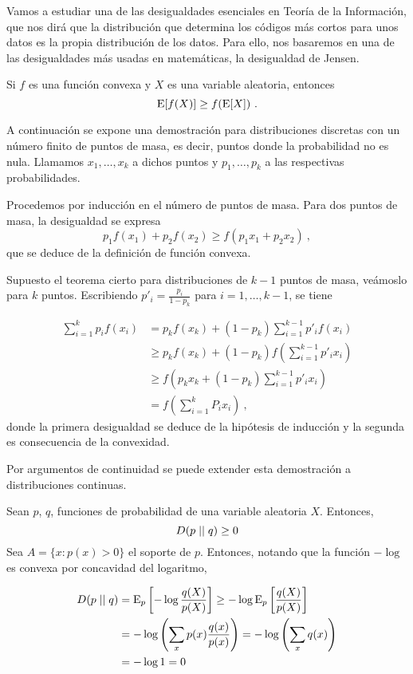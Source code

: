 Vamos a estudiar una de las desigualdades esenciales en Teoría de la
Información, que nos dirá que la distribución que determina los códigos
más cortos para unos datos es la propia distribución de los datos. Para
ello, nos basaremos en una de las desigualdades más usadas en
matemáticas, la desigualdad de Jensen.

Si \(f\) es una función convexa y \(X\) es una variable aleatoria,
entonces \[\mathrm{E}[f(X)]\geq f(\mathrm{E}[X])~.\]

\proofb
A continuación se expone una demostración para distribuciones discretas
con un número finito de puntos de masa, es decir, puntos donde la
probabilidad no es nula. Llamamos \(x_1, \dots, x_k\) a dichos puntos y
\(p_1, \dots, p_k\) a las respectivas probabilidades.

Procedemos por inducción en el número de puntos de masa. Para dos puntos
de masa, la desigualdad se expresa
\[p_1f(x_1)+p_2f(x_2)\geq f(p_1x_1+p_2x_2)~,\] que se deduce de la
definición de función convexa.

Supuesto el teorema cierto para distribuciones de \(k-1\) puntos de
masa, veámoslo para \(k\) puntos. Escribiendo
\(p'_{i}=\frac{p_{i}}{1-p_k}\) para \(i=1,\dots,k-1\), se tiene

\begin{align*}
  \sum_{i=1}^kp_if(x_i)&=p_kf(x_k)+(1-p_k)\sum_{i=1}^{k-1}p'_if(x_i)\\
                       &\geq p_kf(x_k)+(1-p_k)f\left(\sum_{i=1}^{k-1}p'_ix_i\right)\\
                       &\geq f\left(p_kx_k+(1-p_k) \sum_{i=1}^{k-1}p'_ix_i\right)\\
                       &=f\left(\sum_{i=1}^kP_ix_i\right)~,  
\end{align*}
donde la primera desigualdad se deduce de la hipótesis de inducción y la
segunda es consecuencia de la convexidad.

Por argumentos de continuidad se puede extender esta demostración a
distribuciones continuas. \proofe
\theoe

\label{th:information-ineq}
Sean \(p\), \(q\), funciones de probabilidad de una variable aleatoria
\(X\). Entonces, \[D(p\mid\mid q)\geq 0\] \proofb
Sea \(A=\{x :p(x)>0\}\) el soporte de \(p\). Entonces, notando
que la función \(-\log\) es convexa por concavidad del logaritmo,

\begin{align*}
  D(p\mid\mid q)&=\mathrm{E}_p\left[-\log\frac{q(X)}{p(X)}\right]\geq -\log\mathrm{E}_p\left[\frac{q(X)}{p(X)}\right]\\
            &=-\log\left(\sum_{x}p(x)\frac{q(x)}{p(x)}\right)=-\log\left(\sum_{x}q(x)\right)\\
            &=-\log 1= 0
\end{align*}

